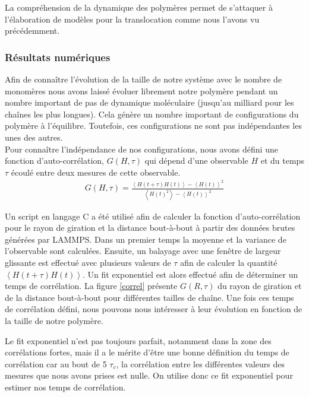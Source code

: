 La compréhension de la dynamique des polymères permet de s'attaquer à l'élaboration de modèles pour la translocation comme nous l'avons vu précédemment.


\subsubsection{Résultats numériques}



Afin de connaître l'évolution de la taille de notre système avec le nombre de monomères nous avons laissé évoluer librement notre polymère pendant un nombre important de pas de dynamique moléculaire (jusqu'au milliard pour les chaînes les plus longues). Cela génère un nombre important de configurations du polymère à l'équilibre. Toutefois, ces configurations ne sont pas indépendantes les unes des autres.\\

Pour connaître l'indépendance de nos configurations, nous avons défini une fonction d'auto-corrélation, $G(H,\tau)$ qui dépend d'une observable $H$ et du temps $\tau$ écoulé entre deux mesures de cette observable.
\begin{eqnarray}
G(H,\tau)=\frac{\left<H(t+\tau)H(t)\right> -\left<H(t)\right>^2}{\left<H(t)^2\right> -\left<H(t)\right> ^2}
\end{eqnarray}

Un script en langage C a été utilisé afin de calculer la fonction d'auto-corrélation pour le rayon de giration et la distance bout-à-bout à partir des données brutes générées par LAMMPS. Dans un premier temps la moyenne et la variance de l'observable sont calculées. Ensuite, un balayage avec une fenêtre de largeur glissante est effectué avec plusieurs valeurs de $\tau$ afin de calculer la quantité $\left<H(t+\tau)H(t)\right>$. Un fit exponentiel est alors effectué afin de déterminer un temps de corrélation. La figure \ref{correl} présente $G(R,\tau)$ du rayon de giration et de la distance bout-à-bout pour différentes tailles de chaîne. Une fois ces temps de corrélation défini, nous pouvons nous intéresser à leur évolution en fonction de la taille de notre polymère.

Le fit exponentiel n'est pas toujours parfait, notamment dans la zone des corrélations fortes, mais il a le mérite d'être une bonne définition du temps de corrélation car au bout de 5 $\tau_c$, la corrélation entre les différentes valeurs des mesures que nous avons prises est nulle. On utilise donc ce fit exponentiel pour estimer nos temps de corrélation. 

